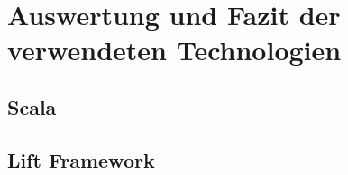 \chapter{Auswertung und Fazit der verwendeten Technologien}
\section{Scala}\label{auswertung:scala}

\section{Lift Framework}\label{auswertung:lift}